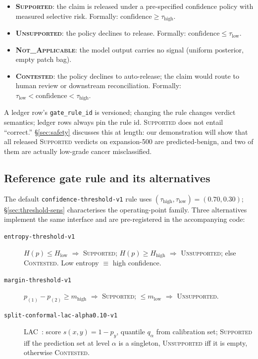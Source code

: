 \documentclass{article}
\begin{document}
\begin{itemize}
    \item \textbf{\textsc{Supported}}: the claim is released under a pre-specified confidence policy with measured selective risk. Formally: $\text{confidence} \ge \tau_{\text{high}}$.
    \item \textbf{\textsc{Unsupported}}: the policy declines to release. Formally: $\text{confidence} \le \tau_{\text{low}}$.
    \item \textbf{\textsc{Not\_Applicable}}: the model output carries no signal (uniform posterior, empty patch bag).
    \item \textbf{\textsc{Contested}}: the policy declines to auto-release; the claim would route to human review or downstream reconciliation. Formally: $\tau_{\text{low}} < \text{confidence} < \tau_{\text{high}}$.
\end{itemize}

A ledger row's \texttt{gate\_rule\_id} is versioned; changing the rule changes verdict semantics; ledger rows always pin the rule id. \textsc{Supported} does not entail ``correct.'' \S\ref{sec:safety} discusses this at length: our demonstration will show that all released \textsc{Supported} verdicts on expansion-500 are predicted-benign, and two of them are actually low-grade cancer misclassified.

\subsection{Reference gate rule and its alternatives}
\label{sec:alt-rules}

The default \texttt{confidence-threshold-v1} rule uses $(\tau_{\text{high}}, \tau_{\text{low}}) = (0.70, 0.30)$; \S\ref{sec:threshold-sens} characterises the operating-point family. Three alternatives implement the same interface and are pre-registered in the accompanying code:

\begin{description}
    \item[\texttt{entropy-threshold-v1}] $H(p) \le H_{\text{low}}$ $\Rightarrow$ \textsc{Supported}; $H(p) \ge H_{\text{high}}$ $\Rightarrow$ \textsc{Unsupported}; else \textsc{Contested}. Low entropy $\equiv$ high confidence.
    \item[\texttt{margin-threshold-v1}] $p_{(1)} - p_{(2)} \ge m_{\text{high}}$ $\Rightarrow$ \textsc{Supported}; $\le m_{\text{low}}$ $\Rightarrow$ \textsc{Unsupported}.
    \item[\texttt{split-conformal-lac-alpha0.10-v1}] LAC~\citep{sadinle2019least}: score $s(x,y) = 1 - p_y$, quantile $q_{\alpha}$ from calibration set; \textsc{Supported} iff the prediction set at level $\alpha$ is a singleton, \textsc{Unsupported} iff it is empty, otherwise \textsc{Contested}.
\end{description}
\end{document}

